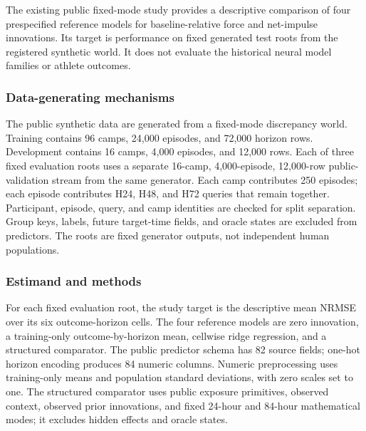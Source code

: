 \documentclass[12pt,a4paper]{article}
\begin{document}
The existing public fixed-mode study provides a descriptive comparison of four prespecified reference models for baseline-relative force and net-impulse innovations. Its target is performance on fixed generated test roots from the registered synthetic world. It does not evaluate the historical neural model families or athlete outcomes.

\subsubsection{Data-generating mechanisms}

The public synthetic data are generated from a fixed-mode discrepancy world. Training contains 96 camps, 24,000 episodes, and 72,000 horizon rows. Development contains 16 camps, 4,000 episodes, and 12,000 rows. Each of three fixed evaluation roots uses a separate 16-camp, 4,000-episode, 12,000-row public-validation stream from the same generator. Each camp contributes 250 episodes; each episode contributes H24, H48, and H72 queries that remain together. Participant, episode, query, and camp identities are checked for split separation. Group keys, labels, future target-time fields, and oracle states are excluded from predictors. The roots are fixed generator outputs, not independent human populations.

\subsubsection{Estimand and methods}

For each fixed evaluation root, the study target is the descriptive mean NRMSE over its six outcome-horizon cells. The four reference models are zero innovation, a training-only outcome-by-horizon mean, cellwise ridge regression, and a structured comparator. The public predictor schema has 82 source fields; one-hot horizon encoding produces 84 numeric columns. Numeric preprocessing uses training-only means and population standard deviations, with zero scales set to one. The structured comparator uses public exposure primitives, observed context, observed prior innovations, and fixed 24-hour and 84-hour mathematical modes; it excludes hidden effects and oracle states.
\end{document}
